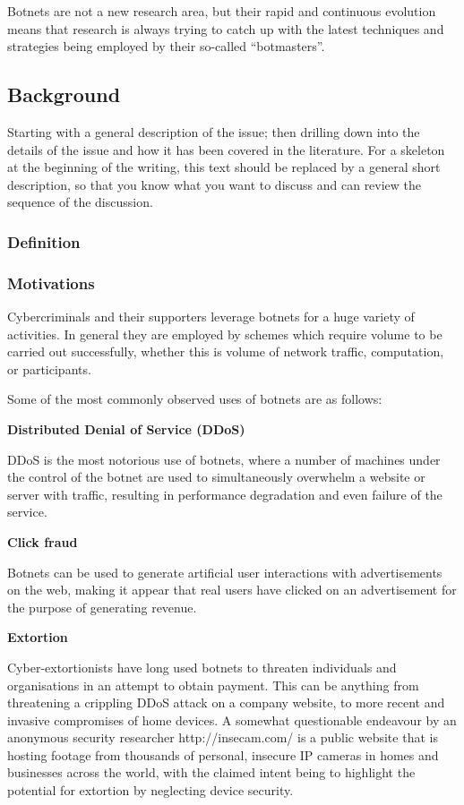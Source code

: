 Botnets are not a new research area, but their rapid and continuous evolution means that research is always trying to catch up with the latest techniques and strategies being employed by their so-called “botmasters”.


\subsection{Background}

Starting with a general description of the issue; then drilling down into the details of the issue and how it has been covered in the literature. For a skeleton at the beginning of the writing, this text should be replaced by a general short description, so that you know what you want to discuss and can review the sequence of the discussion.

\subsubsection{Definition}
\subsubsection{Motivations}
Cybercriminals and their supporters leverage botnets for a huge variety of activities. In general they are employed by schemes which require volume to be carried out successfully, whether this is volume of network traffic, computation, or participants.

Some of the most commonly observed uses of botnets are as follows:

\bullet \textbf{Distributed Denial of Service (DDoS)}

DDoS is the most notorious use of botnets, where a number of machines under the control of the botnet are used to simultaneously overwhelm a website or server with traffic, resulting in performance degradation and even failure of the service.

\bullet \textbf{Click fraud}

Botnets can be used to generate artificial user interactions with advertisements on the web, making it appear that real users have clicked on an advertisement for the purpose of generating revenue.

\bullet \textbf{Extortion}

Cyber-extortionists have long used botnets to threaten individuals and organisations in an attempt to obtain payment. This can be anything from threatening a crippling DDoS attack on a company website, to more recent and invasive compromises of home devices. A somewhat questionable endeavour by an anonymous security researcher {http://insecam.com/} is a public website that is hosting footage from thousands of personal, insecure IP cameras in homes and businesses across the world, with the claimed intent being to highlight the potential for extortion by neglecting device security.

